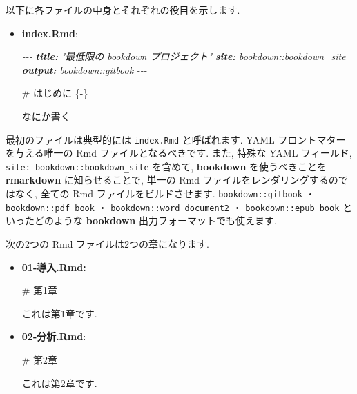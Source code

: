 \documentclass[
  11pt,
  lualatex,ja=standard,jafont=noto]{bxjsreport}
\newenvironment{Shaded}{\begin{snugshade}}{\end{snugshade}}
\newcommand{\AnnotationTok}[1]{\textcolor[rgb]{0.56,0.35,0.01}{\textbf{\textit{#1}}}}
\newcommand{\CommentTok}[1]{\textcolor[rgb]{0.56,0.35,0.01}{\textit{#1}}}
\newcommand{\FunctionTok}[1]{\textcolor[rgb]{0.00,0.00,0.00}{#1}}
\newcommand{\NormalTok}[1]{#1}
\begin{document}
以下に各ファイルの中身とそれぞれの役目を示します.

\begin{itemize}
\item
  \textbf{index.Rmd}:

\begin{Shaded}
\begin{Highlighting}[]
\CommentTok{{-}{-}{-}}
\AnnotationTok{title:}\CommentTok{ "最低限の bookdown プロジェクト"}
\AnnotationTok{site:}\CommentTok{ bookdown::bookdown\_site}
\AnnotationTok{output:}\CommentTok{ bookdown::gitbook}
\CommentTok{{-}{-}{-}}

\FunctionTok{\# はじめに \{{-}\}}

\NormalTok{なにか書く}
\end{Highlighting}
\end{Shaded}
\end{itemize}

最初のファイルは典型的には \texttt{index.Rmd} と呼ばれます. YAML フロントマターを与える唯一の Rmd ファイルとなるべきです. また, 特殊な YAML フィールド, \texttt{site: bookdown::bookdown\_site} を含めて, \textbf{bookdown} を使うべきことを \textbf{rmarkdown} に知らせることで, 単一の Rmd ファイルをレンダリングするのではなく, 全ての Rmd ファイルをビルドさせます. \texttt{bookdown::gitbook} ・ \texttt{bookdown::pdf\_book} ・ \texttt{bookdown::word\_document2} ・ \texttt{bookdown::epub\_book} といったどのような \textbf{bookdown} 出力フォーマットでも使えます.

次の2つの Rmd ファイルは2つの章になります.

\begin{itemize}
\item
  \textbf{01-導入.Rmd:}

\begin{Shaded}
\begin{Highlighting}[]
\FunctionTok{\# 第1章}

\NormalTok{これは第1章です.}
\end{Highlighting}
\end{Shaded}
\item
  \textbf{02-分析.Rmd}:

\begin{Shaded}
\begin{Highlighting}[]
\FunctionTok{\# 第2章}

\NormalTok{これは第2章です.}
\end{Highlighting}
\end{Shaded}
\end{itemize}
\end{document}
